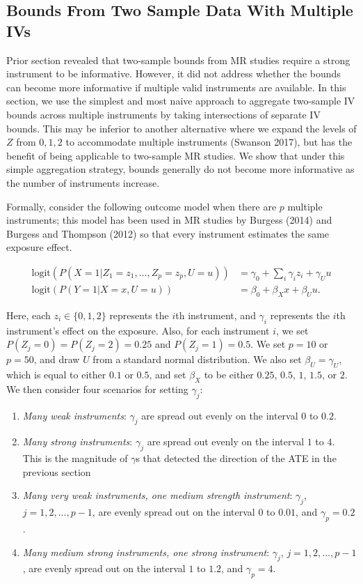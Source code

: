 \documentclass[
]{article}
\theoremstyle{plain}
\begin{document}
\hypertarget{bounds-from-two-sample-data-with-multiple-ivs}{%
\subsection{Bounds From Two Sample Data With Multiple IVs}\label{bounds-from-two-sample-data-with-multiple-ivs}}

Prior section revealed that two-sample bounds from MR studies require a strong instrument to be informative. However, it did not address whether the bounds can become more informative if multiple valid instruments are available. In this section, we use the simplest and most naive approach to aggregate two-sample IV bounds across multiple instruments by taking intersections of separate IV bounds. This may be inferior to another alternative where we expand the levels of \(Z\) from \(0,1,2\) to accommodate multiple instruments (Swanson 2017), but has the benefit of being applicable to two-sample MR studies. We show that under this simple aggregation strategy, bounds generally do not become more informative as the number of instruments increase.

Formally, consider the following outcome model when there are \(p\) multiple instruments; this model has been used in MR studies by Burgess (2014) and Burgess and Thompson (2012) so that every instrument estimates the same exposure effect.

\[
\begin{aligned}
\text{logit}(P(X = 1 | Z_1 = z_1, ..., Z_p = z_p, U = u)) &= \gamma_0 + \sum_i \gamma_i z_i + \gamma_U u \\
\text{logit}(P(Y = 1 | X = x, U = u)) &= \beta_0 + \beta_X x + \beta_U u.
\end{aligned}
\]

Here, each \(z_i \in \{0,1,2\}\) represents the \(i\)th instrument, and \(\gamma_i\) represents the \(i\)th instrument's effect on the exposure. Also, for each instrument \(i\), we set \(P(Z_j = 0) = P(Z_j = 2) = 0.25\) and \(P(Z_j = 1) = 0.5\). We set \(p = 10\) or \(p = 50\), and draw \(U\) from a standard normal distribution. We also set \(\beta_U = \gamma_U\), which is equal to either \(0.1\) or \(0.5\), and set \(\beta_X\) to be either \(0.25\), \(0.5\), \(1\), \(1.5\), or \(2\). We then consider four scenarios for setting \(\gamma_j\):

\begin{enumerate}
\item \emph{Many weak instruments}: \(\gamma_j\) are spread out evenly on the interval \(0\) to \(0.2\).
\item \emph{Many strong instruments}: \(\gamma_j\) are spread out evenly on the interval \(1\) to \(4\). This is the magnitude of $\gamma$s that detected the direction of the ATE in the previous section
\item \emph{Many very weak instruments, one medium strength instrument}: $\gamma_j$, $j=1,2,...,p-1$, are evenly spread out on the interval $0$ to $0.01$, and $\gamma_p = 0.2$. 
\item \emph{Many medium strong instruments, one strong instrument}: $\gamma_j$, $j=1,2,...,p-1$, are evenly spread out on the interval $1$ to $1.2$, and $\gamma_p = 4$.
\end{enumerate}
\end{document}
